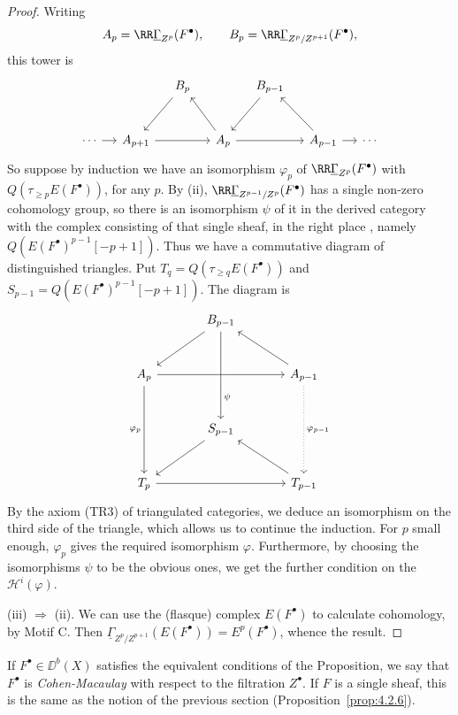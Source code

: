 \begin{proof}
Writing
\[
A_p=\RR\underline{\Gamma}_{Z^p}(F^\bullet),\qquad
B_p=\RR\underline{\Gamma}_{Z^p/Z^{p+1}}(F^\bullet),
\]
this tower is
\[
\begin{tikzcd}[row sep=large, column sep=small]
 & & B_p \arrow[dl] & & B_{p-1} \arrow[dl] & & \\
\cdots \arrow[r] & A_{p+1} \arrow[rr] & & A_p \arrow[ul] \arrow[rr]
 & & A_{p-1} \arrow[ul] \arrow[r] & \cdots
\end{tikzcd}
\]
So suppose by induction we have an isomorphism $\varphi_p$ of $\RR\underline{\Gamma}_{Z^p}(F^\bullet)$ with $Q(\tau_{\geq p}E(F^\bullet))$, for any $p$. By (ii), $\RR\underline{\Gamma}_{Z^{p-1}/Z^p}(F^\bullet)$ has a single non-zero cohomology group, so there is an isomorphism $\psi$ of it in the derived category with the complex consisting of that single sheaf, in the right place , namely $Q(E(F^\bullet)^{p-1}[-p+1])$. Thus we have a commutative diagram of distinguished triangles.
Put $T_q=Q(\tau_{\geq q}E(F^\bullet))$ and
$S_{p-1}=Q(E(F^\bullet)^{p-1}[-p+1])$. The diagram is
\[
\begin{tikzcd}[row sep=large, column sep=large]
 & B_{p-1} \arrow[dl] \arrow[dd, "\psi" near end, crossing over] & \\
A_p \arrow[rr] \arrow[dd, "\varphi_p"'] & & A_{p-1} \arrow[ul] \arrow[dd, "\varphi_{p-1}", dotted] \\
 & S_{p-1} \arrow[dl] & \\
T_p \arrow[rr] & & T_{p-1} \arrow[ul]
\end{tikzcd}
\]
By the axiom (TR3) of triangulated categories, we deduce an isomorphism on the third side of the triangle, which allows us to continue the induction. For $p$ small enough, $\varphi_p$ gives the required isomorphism $\varphi$. Furthermore, by choosing the isomorphisms $\psi$ to be the obvious ones, we get the further condition on the $\mathcal{H}^{i}(\varphi)$.

(iii) $\Longrightarrow$ (ii). We can use the (flasque) complex $E(F^\bullet)$ to calculate cohomology, by Motif C. Then $\underline{\Gamma}_{Z^p/Z^{p+1}}(E(F^\bullet))=E^{p}(F^\bullet)$, whence the result.
\end{proof}

\begin{definition*}
If $F^\bullet\in\DD^b(X)$ satisfies the equivalent conditions of the Proposition, we say that $F^\bullet$ is \emph{Cohen-Macaulay} with respect to the filtration $Z^\bullet$. If $F$ is a single sheaf, this is the same as the notion of the previous section (Proposition~\ref{prop:4.2.6}).
\end{definition*}

